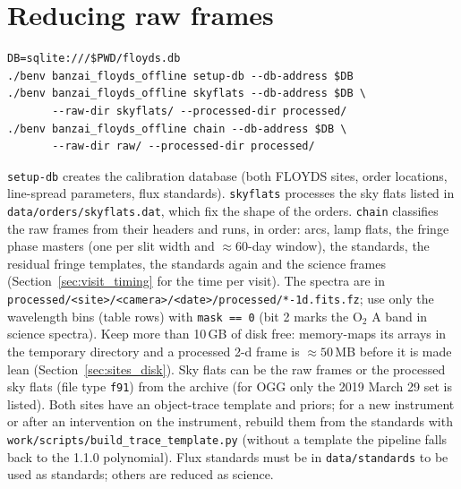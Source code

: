 \section{Reducing raw frames}
\begin{verbatim}
DB=sqlite:///$PWD/floyds.db
./benv banzai_floyds_offline setup-db --db-address $DB
./benv banzai_floyds_offline skyflats --db-address $DB \
       --raw-dir skyflats/ --processed-dir processed/
./benv banzai_floyds_offline chain --db-address $DB \
       --raw-dir raw/ --processed-dir processed/
\end{verbatim}
\texttt{setup-db} creates the calibration database (both FLOYDS sites, order locations, line-spread parameters, flux
standards). \texttt{skyflats} processes the sky flats listed in \texttt{data/orders/skyflats.dat}, which fix the shape
of the orders. \texttt{chain} classifies the raw frames from their headers and runs, in order: arcs, lamp flats, the
fringe phase masters (one per slit width and $\approx60$-day window), the standards, the residual fringe templates, the
standards again and the science frames (Section~\ref{sec:visit_timing} for the time per visit). The spectra are in
\texttt{processed/<site>/<camera>/<date>/processed/*-1d.fits.fz}; use only the wavelength bins (table rows) with \texttt{mask == 0} (bit 2 marks
the O$_2$ A band in science spectra). Keep more than 10\,GB of disk free: \banzai{} memory-maps its arrays in the
temporary directory and a processed 2-d frame is $\approx50$\,MB before it is made lean
(Section~\ref{sec:sites_disk}). Sky flats can be the raw frames or the processed sky flats (file type \texttt{f91}) from the archive
(for OGG only the 2019 March 29 set is listed). Both sites have an object-trace template and priors; for a new
instrument or after an intervention on the instrument, rebuild them from the standards with \texttt{work/scripts/build\_trace\_template.py}
(without a template the pipeline falls back to the 1.1.0 polynomial). Flux standards must be in
\texttt{data/standards} to be used as standards; others are reduced as science.
